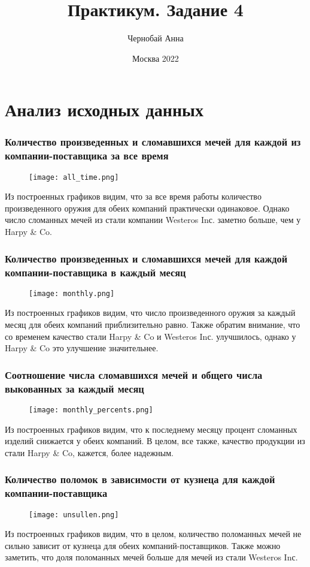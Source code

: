 \documentclass[10pt,pdf,hyperref={unicode}]{beamer}
\title{\huge Практикум. Задание 4 }
\author{Чернобай Анна}
\date{Москва 2022}
\begin{document}
\frame[plain]{\titlepage}

\section{Анализ исходных данных}

\begin{frame}
\frametitle{Количество произведенных и сломавшихся мечей для каждой из компании-поставщика за все время}
\begin{figure}[t]
    \centering
    \texttt{[image: all\_time.png]}
\end{figure}
Из построенных графиков видим, что за все время работы количество произведенного оружия для обеих компаний практически одинаковое. Однако число сломанных мечей из стали компании Westeros Inс. заметно больше, чем у Harpy \& Co.
\end{frame}

\begin{frame}
\frametitle{Количество произведенных и сломавшихся мечей для каждой компании-поставщика в каждый месяц}
\begin{figure}[t]
    \centering
    \texttt{[image: monthly.png]}
\end{figure}
Из построенных графиков видим, что число произведенного оружия за каждый месяц для обеих компаний приблизительно равно. Также обратим внимание, что со временем качество стали Harpy \& Co и Westeros Inс. улучшилось, однако у Harpy \& Co это улучшение значительнее.
\end{frame}

\begin{frame}
\frametitle{Соотношение числа сломавшихся мечей и общего числа выкованных за каждый месяц}
\begin{figure}[t]
    \centering
    \texttt{[image: monthly\_percents.png]}
\end{figure}
Из построенных графиков видим, что к последнему месяцу процент сломанных изделий снижается у обеих компаний. В целом, все также, качество продукции из стали Harpy \& Co, кажется, более надежным.
\end{frame}

\begin{frame}
\frametitle{Количество поломок в зависимости от кузнеца для каждой компании-поставщика}
\begin{figure}[t]
    \centering
    \texttt{[image: unsullen.png]}
\end{figure}
Из построенных графиков видим, что в целом, количество поломанных мечей не сильно зависит от кузнеца для обеих компаний-поставщиков. Также можно заметить, что доля поломанных мечей больше для мечей из стали Westeros Inс.
\end{frame}
\end{document}
